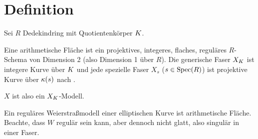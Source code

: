 \documentclass[german, bibliography=totoc]{scrreprt}
\renewcommand*{\optcite}[2][]{}
\begin{document}
\section{Definition}
\begin{Definition}
  Sei $R$ Dedekindring mit Quotientenkörper $K$.

  
  \optcite[Definition 8.3.1, 8.3.14]{liu}
  Eine arithmetische Fläche ist ein projektives, integeres, flaches,
  reguläres $R$-Schema von Dimension 2 (also Dimension 1 über $R$).
  Die generische Faser $X_{K}$ ist integere Kurve über $K$ und jede
  spezielle Faser $X_s$ ($s\in\operatorname{Spec}(R)$) ist projektive Kurve über
  $\kappa(s)$ nach \cite[Lemma 8.3.3]{liu}.
  
  $X$ ist also ein $X_{K}$-Modell.
\end{Definition}

\begin{Beispiel}\label{bsp:regweierstraßmodell}
  Ein reguläres Weierstraßmodell einer elliptischen Kurve ist
  arithmetische Fläche.
  Beachte, dass $W$ regulär sein kann, aber dennoch nicht glatt, also
  singulär in einer Faser.
\end{Beispiel}
\end{document}
